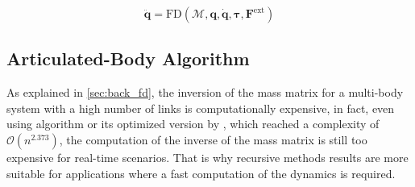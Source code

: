 \begin{equation}
    \ddot{\mathbf{q}} = \mathrm{FD} (\mathcal{M}, \mathbf{q}, \dot{\mathbf{q}}, \boldsymbol{\tau}, \mathbf{F} ^{\text{ext}})
\end{equation}

\subsection{Articulated-Body Algorithm}
\label{subsec:back_aba}

As explained in \cref{sec:back_fd}, the inversion of the mass matrix for a multi-body system with a high number of links is computationally expensive, in fact, even using \citet{coppersmith_matrix_1990} algorithm or its optimized version by \citet{vassilevska-williams2012breaking}, which reached a complexity of $\mathcal{O}(n^{2.373})$, the computation of the inverse of the mass matrix is still too expensive for real-time scenarios. That is why recursive methods results are more suitable for applications where a fast computation of the dynamics is required.


